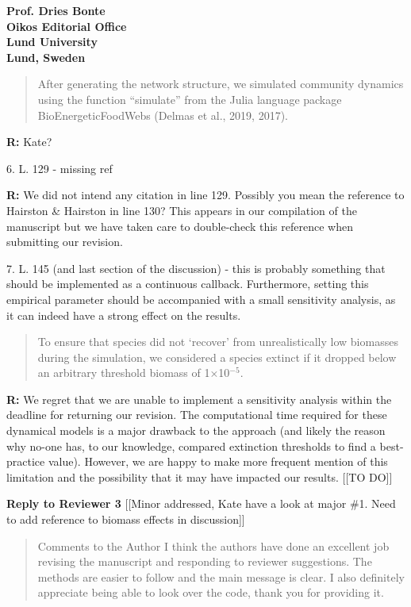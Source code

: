 \documentclass[12pt]{letter}
\begin{document}
\begin{letter}{\bf Prof. Dries Bonte\\
Oikos Editorial Office \\
Lund University \\
Lund, Sweden}
    \begin{quotation}
    After generating the network structure, we simulated community dynamics using the function ``simulate'' from the Julia language package BioEnergeticFoodWebs (Delmas et al., 2019, 2017).
    \end{quotation}

    \smallskip

    \textbf{R:} Kate?

    \smallskip

    6. L. 129 - missing ref

    \smallskip

    \textbf{R:} We did not intend any citation in line 129. Possibly you mean the reference to Hairston \& Hairston in line 130? This appears in our compilation of the manuscript but we have taken care to double-check this reference when submitting our revision.%

    \smallskip

    7. L. 145 (and last section of the discussion) - this is probably something that should be implemented as a continuous callback. Furthermore, setting this empirical parameter should be accompanied with a small sensitivity analysis, as it can indeed have a strong effect on the results.

    \smallskip

    \begin{quotation}
    To ensure that species did not ‘recover’ from unrealistically low biomasses during the simulation, we considered a species extinct if it dropped below an arbitrary threshold biomass of 1×10$^{-5}$.
    \end{quotation}

    \textbf{R:} We regret that we are unable to implement a sensitivity analysis within the deadline for returning our revision. The computational time required for these dynamical models is a major drawback to the approach (and likely the reason why no-one has, to our knowledge, compared extinction thresholds to find a best-practice value). However, we are happy to make more frequent mention of this limitation and the possibility that it may have impacted our results. [[TO DO]]

\clearpage


{\large \textbf{Reply to Reviewer 3}} [[Minor addressed, Kate have a look at major \#1. Need to add reference to biomass effects in discussion]]

  \begin{quotation}
    Comments to the Author
    I think the authors have done an excellent job revising the manuscript and responding to reviewer suggestions. The methods are easier to follow and the main message is clear. I also definitely appreciate being able to look over the code, thank you for providing it.   


\end{quotation}
\end{letter}
\end{document}
